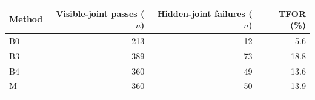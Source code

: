 \begin{tabular}{lrrr}
\toprule
Method & Visible-joint passes ($n$) & Hidden-joint failures ($n$) & TFOR (\%) \\
\midrule
B0 & 213 & 12 & 5.6 \\
B3 & 389 & 73 & 18.8 \\
B4 & 360 & 49 & 13.6 \\
M & 360 & 50 & 13.9 \\
\bottomrule
\end{tabular}
